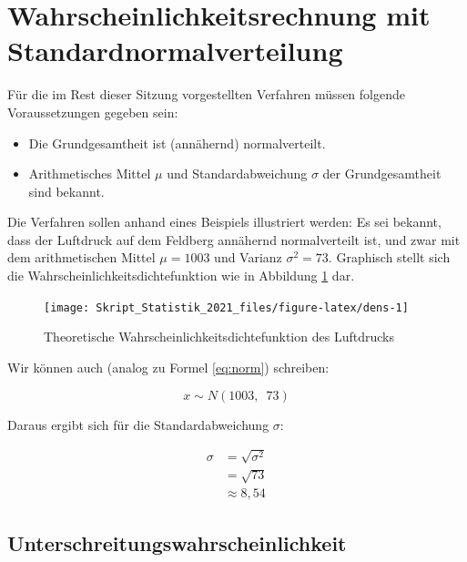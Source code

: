 \documentclass[
  11pt,
  ngerman,
  a4paper,
]{report}
\providecommand{\tightlist}{%
  \setlength{\itemsep}{0pt}\setlength{\parskip}{0pt}}
\begin{document}
\hypertarget{wahrscheinlichkeitsrechnung-mit-standardnormalverteilung}{%
\section{Wahrscheinlichkeitsrechnung mit Standardnormalverteilung}\label{wahrscheinlichkeitsrechnung-mit-standardnormalverteilung}}

Für die im Rest dieser Sitzung vorgestellten Verfahren müssen folgende Voraussetzungen gegeben sein:

\begin{itemize}
\tightlist
\item
  Die Grundgesamtheit ist (annähernd) normalverteilt.
\item
  Arithmetisches Mittel \(\mu\) und Standardabweichung \(\sigma\) der Grundgesamtheit sind bekannt.
\end{itemize}

Die Verfahren sollen anhand eines Beispiels illustriert werden: Es sei bekannt, dass der Luftdruck auf dem Feldberg annähernd normalverteilt ist, und zwar mit dem arithmetischen Mittel \(\mu=1003\) und Varianz \(\sigma^2=73\). Graphisch stellt sich die Wahrscheinlichkeitsdichtefunktion wie in Abbildung \ref{fig:dens} dar.

\begin{figure}[t]

{\centering \texttt{[image: Skript\_Statistik\_2021\_files/figure-latex/dens-1]} 

}

\caption{Theoretische Wahrscheinlichkeitsdichtefunktion des Luftdrucks}\label{fig:dens}
\end{figure}

Wir können auch (analog zu Formel \eqref{eq:norm}) schreiben:

\[
x \sim N(1003,\enspace73)
\]

Daraus ergibt sich für die Standardabweichung \(\sigma\):
\nopagebreak

\[\begin{aligned}
\sigma&=\sqrt{\sigma^2}\\
&=\sqrt{73}\\
&\approx8{,}54
\end{aligned}\]

\hypertarget{unter}{%
\subsection{Unterschreitungswahrscheinlichkeit}\label{unter}}
\end{document}
